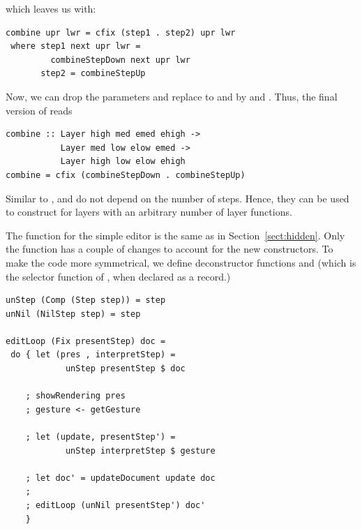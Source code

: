\documentclass[preprint,natbib]{sigplanconf}
\begin{document}
which leaves us with:

\begin{small}%
\begin{verbatim}
combine upr lwr = cfix (step1 . step2) upr lwr
 where step1 next upr lwr = 
         combineStepDown next upr lwr
       step2 = combineStepUp
\end{verbatim}
\end{small}


Now, we can drop the parameters and replace to  and  by  and . Thus, the final version of  reads

\begin{small}%
\begin{verbatim}
combine :: Layer high med emed ehigh ->
           Layer med low elow emed -> 
           Layer high low elow ehigh
combine = cfix (combineStepDown . combineStepUp)
\end{verbatim}
\end{small}


Similar to ,  and  do not depend on the number of steps. Hence, they can be used to construct  for layers with an arbitrary number of layer functions.



The  function for the simple editor is the same as in Section~\ref{sect:hidden}. Only the  function has a couple of changes to account for the new constructors. To make the code more symmetrical, we define deconstructor functions  and  (which is the selector function of , when declared as a record.)

\begin{small}
\begin{verbatim}
unStep (Comp (Step step)) = step
unNil (NilStep step) = step

editLoop (Fix presentStep) doc = 
 do { let (pres , interpretStep) = 
            unStep presentStep $ doc
    
    ; showRendering pres
    ; gesture <- getGesture
    
    ; let (update, presentStep') =
            unStep interpretStep $ gesture
    
    ; let doc' = updateDocument update doc
    ; 
    ; editLoop (unNil presentStep') doc'
    }
\end{verbatim}%
\end{small}
\end{document}
